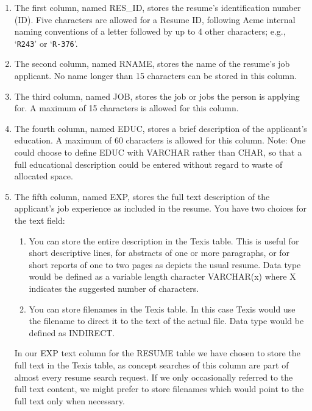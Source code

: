 \begin{enumerate}
\item The first column, named RES\_ID, stores the resume's
identification number (ID).
Five characters are allowed for a Resume ID,
following Acme internal naming conventions of a letter followed by up
to 4 other characters; e.g., `\verb`R243`' or `\verb`R-376`'.

\item The second column, named RNAME, stores the name of the resume's
job applicant.  No name longer than 15 characters can be stored in
this column.

\item The third column, named JOB, stores the job or jobs the person
is applying for.  A maximum of 15 characters is allowed for this
column.

\item The fourth column, named EDUC, stores a brief description of the
applicant's education.  A maximum of 60 characters is allowed for this
column.  Note:  One could choose to define EDUC with VARCHAR rather
than CHAR, so that a full educational description could be entered
without regard to waste of allocated space.

\item The fifth column, named EXP, stores the full text description of
the applicant's job experience as included in the resume.  You have
two choices for the text field:

 \begin{enumerate}
 \item You can store the entire description in the Texis table.  This
 is useful for short descriptive lines, for abstracts of one or more
 paragraphs, or for short reports of one to two pages as depicts the
 usual resume.  Data type would be defined as a variable length
 character VARCHAR(x) where X indicates the suggested number of
 characters.

 \item You can store filenames in the Texis table.  In this case Texis
 would use the filename to direct it to the text of the actual file.
 Data type would be defined as INDIRECT.
 \end{enumerate}

In our EXP text column for the RESUME table we have chosen to store
the full text in the Texis table, as concept searches of this column
are part of almost every resume search request.  If we only
occasionally referred to the full text content, we might prefer to
store filenames which would point to the full text only when
necessary.
\end{enumerate}

